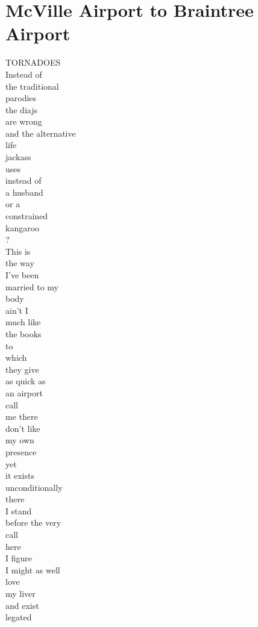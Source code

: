 \documentclass[smalldemyvopaper,11pt,twoside,onecolumn,openright,extrafontsizes]{memoir}
\begin{document}
\chapter{McVille Airport to Braintree Airport}
TORNADOES
\\Instead of
\\the traditional
\\parodies
\\the diajs
\\are wrong
\\and the alternative
\\life
\\jackass
\\uses
\\instead of
\\a husband
\\or a
\\constrained
\\kangaroo
\\?
\\This is
\\the way
\\I've been
\\married to my
\\body
\\ain't I
\\much like
\\the books
\\to
\\which
\\they give
\\as quick as
\\an airport
\\call
\\me there
\\don't like
\\my own
\\presence
\\yet
\\it exists
\\unconditionally
\\there
\\I stand
\\before the very
\\call
\\here
\\I figure
\\I might as well
\\love
\\my liver
\\and exist
\\legated
\end{document}
